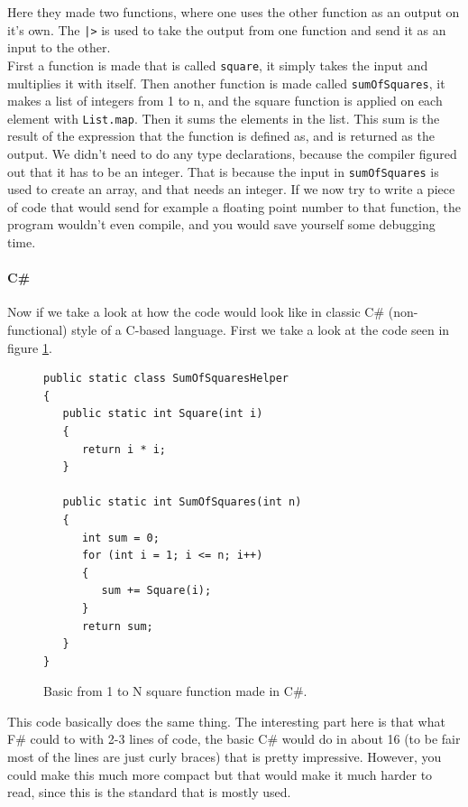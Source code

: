 \documentclass[12pt, a4paper]{article}
\newcommand{\code}[1]{{\small \texttt{#1}}}
\begin{document}
Here they made two functions, where one uses the other function as an output on it's own. The \code{|>} is used to take the output from one function and send it as an input to the other.\\

First a function is made that is called \code{square}, it simply takes the input and multiplies it with itself. Then another function is made called \code{sumOfSquares}, it makes a list of integers from 1 to n, and the square function is applied on each element with \code{List.map}. Then it sums the elements in the list. This sum is the result of the expression that the function is defined as, and is returned as the output. We didn't need to do any type declarations, because the compiler figured out that it has to be an integer. That is because the input in \code{sumOfSquares} is used to create an array, and that needs an integer. If we now try to write a piece of code that would send for example a floating point number to that function, the program wouldn't even compile, and you would save yourself some debugging time.\\

\newpage

\paragraph{C\#}
Now if we take a look at how the code would look like in classic C\# (non-functional) style of a C-based language. First we take a look at the code seen in figure \ref{fig:SquareFunctionCSharp}.

\begin{figure}[!h]
\begin{lstlisting}
public static class SumOfSquaresHelper
{
   public static int Square(int i)
   {
      return i * i;
   }

   public static int SumOfSquares(int n)
   {
      int sum = 0;
      for (int i = 1; i <= n; i++)
      {
         sum += Square(i);
      }
      return sum;
   }
}
\end{lstlisting}
\caption{Basic from 1 to N square function made in C\#.}
\label{fig:SquareFunctionCSharp}
\end{figure}

This code basically does the same thing. The interesting part here is that what F\# could to with 2-3 lines of code, the basic C\# would do in about 16 (to be fair most of the lines are just curly braces) that is pretty impressive. However, you could make this much more compact but that would make it much harder to read, since this is the standard that is mostly used.\\
\end{document}
